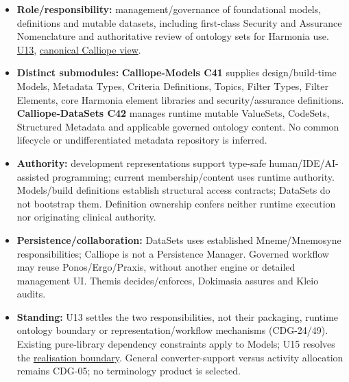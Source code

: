 \begin{itemize}


\item \textbf{Role/responsibility:} management/governance of foundational models, definitions
  and mutable datasets, including first-class Security and Assurance Nomenclature
  and authoritative review of ontology sets for Harmonia use. \href{\detokenize{../../../../../../../../../docs/markdown/05-information-systems-architecture/sources.md#u13}}{U13},
  \href{\detokenize{../../../../../../../../../docs/markdown/05-information-systems-architecture/calliope-models-and-datasets.md}}{canonical Calliope view}.

\item \textbf{Distinct submodules:} \textbf{Calliope-Models C41} supplies design/build-time
  Models, Metadata Types, Criteria Definitions, Topics, Filter Types, Filter Elements,
  core Harmonia element libraries and security/assurance definitions.
  \textbf{Calliope-DataSets C42} manages runtime mutable ValueSets, CodeSets, Structured
  Metadata and applicable governed ontology content. No common lifecycle or
  undifferentiated metadata repository is inferred.

\item \textbf{Authority:} development representations support type-safe human/IDE/AI-assisted
  programming; current membership/content uses runtime authority. Models/build
  definitions establish structural access contracts; DataSets do not bootstrap them.
  Definition ownership confers neither runtime execution nor originating clinical authority.

\item \textbf{Persistence/collaboration:} DataSets uses established Mneme/Mnemosyne
  responsibilities; Calliope is not a Persistence Manager. Governed workflow may
  reuse Ponos/Ergo/Praxis, without another engine or detailed management UI.
  Themis decides/enforces, Dokimasia assures and Kleio audits.

\item \textbf{Standing:} U13 settles the two responsibilities, not their packaging, runtime
  ontology boundary or representation/workflow mechanisms (CDG-24/49). Existing
  pure-library dependency constraints apply to Models; U15 resolves the
  \href{\detokenize{../../../../../../../../../docs/markdown/05-information-systems-architecture/calliope-models-and-datasets.md#calliope-realisation}}{realisation boundary}.
  General converter-support
  versus activity allocation remains CDG-05; no terminology product is selected.

\end{itemize}







